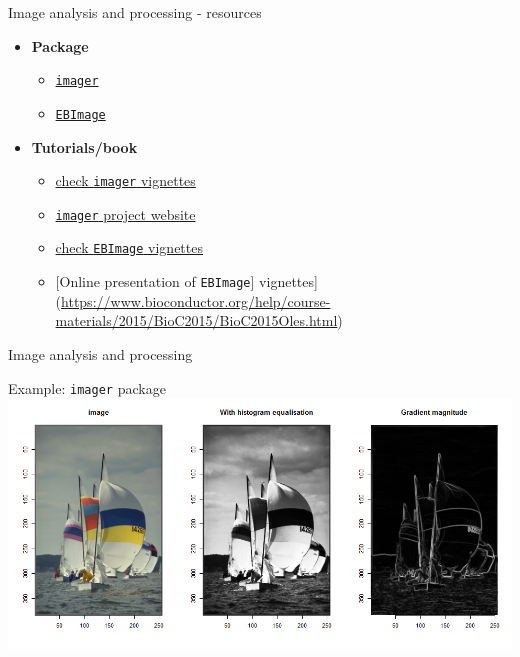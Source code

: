 \documentclass[8pt,ignorenonframetext,]{beamer}
\providecommand{\tightlist}{%
  \setlength{\itemsep}{0pt}\setlength{\parskip}{0pt}}
\begin{document}
\begin{frame}[fragile]{Image analysis and processing - resources}

\begin{itemize}
\tightlist
\item
  \textbf{Package}

  \begin{itemize}
  \tightlist
  \item
    \href{https://cran.r-project.org/web/packages/imager/index.html}{\texttt{imager}}
  \item
    \href{https://cran.r-project.org/web/packages/EBImage/index.html}{\texttt{EBImage}}
  \end{itemize}
\item
  \textbf{Tutorials/book}

  \begin{itemize}
  \tightlist
  \item
    \href{https://cran.r-project.org/web/packages/imager/index.html}{check
    \texttt{imager} vignettes}
  \item
    \href{https://dahtah.github.io/imager/}{\texttt{imager} project
    website}
  \item
    \href{https://www.bioconductor.org/packages/3.7/bioc/vignettes/EBImage/inst/doc/EBImage-introduction.html}{check
    \texttt{EBImage} vignettes}
  \item
    {[}Online presentation of \texttt{EBImage}{]}
    vignettes{]}(\url{https://www.bioconductor.org/help/course-materials/2015/BioC2015/BioC2015Oles.html})
  \end{itemize}
\end{itemize}

\end{frame}

\begin{frame}[fragile]{Image analysis and processing}

Example: \texttt{imager} package
\includegraphics{imgPres/image_processing.png}

\end{frame}
\end{document}
